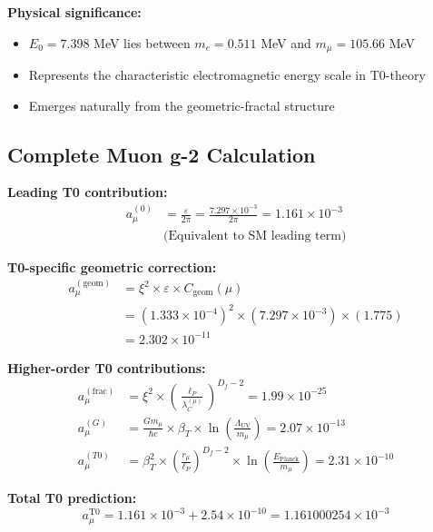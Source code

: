 \documentclass[12pt,a4paper]{article}
\numberwithin{equation}{section}
\newcommand{\xipar}{\xi}
\newcommand{\epsilonT}{\varepsilon}
\newcommand{\Cgeom}{C_{\text{geom}}}
\newcommand{\Df}{D_f}
\newcommand{\Eo}{E_0}
\newcommand{\lP}{\ell_P}
\newcommand{\lambdaC}{\lambda_C}
\begin{document}
	\textbf{Physical significance:}
	\begin{itemize}
		\item $\Eo = 7.398$ MeV lies between $m_e = 0.511$ MeV and $m_\mu = 105.66$ MeV
		\item Represents the characteristic electromagnetic energy scale in T0-theory
		\item Emerges naturally from the geometric-fractal structure
	\end{itemize}
	
	\subsection{Complete Muon g-2 Calculation}
	
	\textbf{Leading T0 contribution:}
	\begin{align}
		a_\mu^{(0)} &= \frac{\epsilonT}{2\pi} = \frac{7.297 \times 10^{-3}}{2\pi} = 1.161 \times 10^{-3}\\
		&\text{(Equivalent to SM leading term)}
		\label{eq:muon_leading}
	\end{align}
	
	\textbf{T0-specific geometric correction:}
	\begin{align}
		a_\mu^{(\text{geom})} &= \xipar^2 \times \epsilonT \times \Cgeom(\mu)\\
		&= (1.333 \times 10^{-4})^2 \times (7.297 \times 10^{-3}) \times (1.775)\\
		&= 2.302 \times 10^{-11}
		\label{eq:muon_geometric}
	\end{align}
	
	\textbf{Higher-order T0 contributions:}
	\begin{align}
		a_\mu^{(\text{frac})} &= \xipar^2 \times \left(\frac{\lP}{\lambdaC^{(\mu)}}\right)^{\Df-2} = 1.99 \times 10^{-25}\\
		a_\mu^{(G)} &= \frac{G m_\mu}{\hbar c} \times \beta_T \times \ln\left(\frac{\Lambda_{\text{UV}}}{m_\mu}\right) = 2.07 \times 10^{-13}\\
		a_\mu^{(T0)} &= \beta_T^2 \times \left(\frac{r_\mu}{\lP}\right)^{\Df-2} \times \ln\left(\frac{E_{\text{Planck}}}{m_\mu}\right) = 2.31 \times 10^{-10}
		\label{eq:muon_higher_order}
	\end{align}
	
	\textbf{Total T0 prediction:}
	\begin{equation}
		a_\mu^{\text{T0}} = 1.161 \times 10^{-3} + 2.54 \times 10^{-10} = 1.161000254 \times 10^{-3}
		\label{eq:muon_total_final}
	\end{equation}
	
\end{document}
